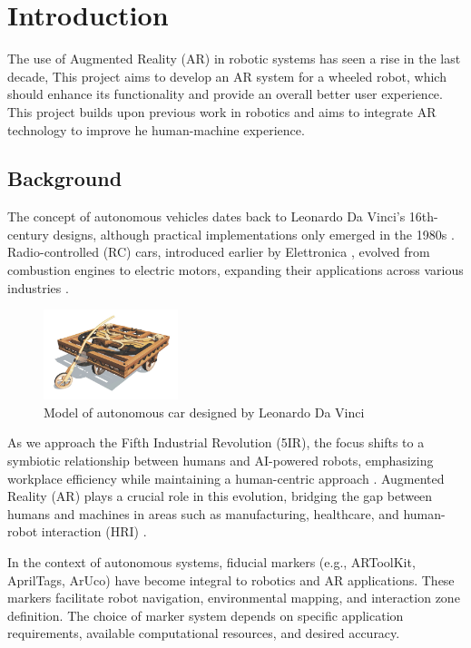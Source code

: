 \chapter{\label{ch:intro} Introduction}

The use of Augmented Reality (AR) in robotic systems has seen a rise in the last decade, This project aims to develop an AR system for a wheeled robot, which should enhance its functionality and provide an overall better user experience. This project builds upon previous work in robotics and aims to integrate AR technology to improve he human-machine experience.

\section{\label{sec:backg}Background}
The concept of autonomous vehicles dates back to Leonardo Da Vinci's 16th-century designs, although practical implementations only emerged in the 1980s \cite{Mobileye2023}. Radio-controlled (RC) cars, introduced earlier by Elettronica \cite{RC_Crush2023}, evolved from combustion engines to electric motors, expanding their applications across various industries \cite{GoogleBooks2017}.
\begin{figure}[h]
\centering
\includegraphics[width=0.35\textwidth]{ch1/figs/Vinci_car.jpg}
\caption{Model of autonomous car designed by Leonardo Da Vinci}
\label{fig:davinci_car}
\end{figure}
As we approach the Fifth Industrial Revolution (5IR), the focus shifts to a symbiotic relationship between humans and AI-powered robots, emphasizing workplace efficiency while maintaining a human-centric approach \cite{Samuels2023}. Augmented Reality (AR) plays a crucial role in this evolution, bridging the gap between humans and machines in areas such as manufacturing, healthcare, and human-robot interaction (HRI) \cite{Dalle2021}.

In the context of autonomous systems, fiducial markers (e.g., ARToolKit, AprilTags, ArUco) have become integral to robotics and AR applications. These markers facilitate robot navigation, environmental mapping, and interaction zone definition. The choice of marker system depends on specific application requirements, available computational resources, and desired accuracy.

